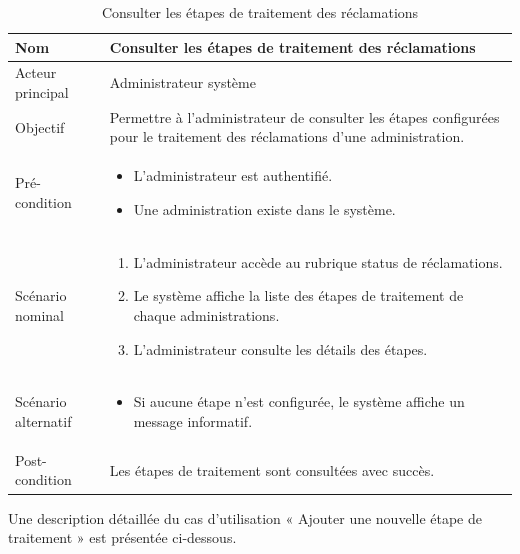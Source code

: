 \begin{table}[H]
\centering
\begin{tabular}{ |p{4cm}|p{12cm}|} \hline

Nom & Consulter les étapes de traitement des réclamations \\ \hline

Acteur principal & Administrateur système \\ \hline

Objectif & Permettre à l’administrateur de consulter les étapes configurées pour le traitement des réclamations d’une administration. \\ \hline

Pré-condition &
\begin{itemize}
    \item L’administrateur est authentifié.
    \item Une administration existe dans le système.
\end{itemize}
\\ \hline

Scénario nominal &
\begin{enumerate}
    \item L’administrateur accède au rubrique status de réclamations.
    \item Le système affiche la liste des étapes de traitement de chaque administrations.
    \item L’administrateur consulte les détails des étapes.
\end{enumerate}
\\ \hline

Scénario alternatif &
\begin{itemize}
    \item Si aucune étape n’est configurée, le système affiche un message informatif.
\end{itemize}
\\ \hline

Post-condition &
Les étapes de traitement sont consultées avec succès. \\ \hline

\end{tabular}
\caption{Consulter les étapes de traitement des réclamations}
\end{table}


Une description détaillée du cas d’utilisation « Ajouter une nouvelle étape de traitement » est présentée ci-dessous.

